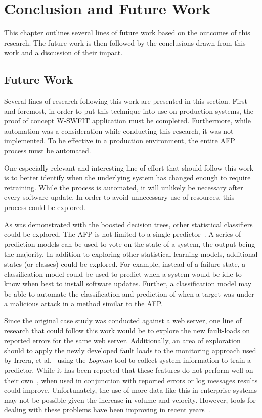 \chapter{Conclusion and Future Work} \label{chapter5}
This chapter outlines several lines of future work based on the outcomes of
this research.  The future work is then followed by the conclusions drawn from
this work and a discussion of their impact.

\section{Future Work}
Several lines of research following this work are presented in this section.
First and foremost, in order to put this technique into use on production
systems, the proof of concept \ac{W-SWFIT} application must be completed.
Furthermore, while automation was a consideration while conducting this
research, it was not implemented.  To be effective in a production environment,
the entire \ac{AFP} process must be automated.

One especially relevant and interesting line of effort that should follow this
work is to better identify when the underlying system has changed enough to
require retraining.  While the process is automated, it will unlikely be
necessary after every software update.  In order to avoid unnecessary use of
resources, this process could be explored.

As was demonstrated with the boosted decision trees, other statistical
classifiers could be explored.  The \ac{AFP} is not limited to a single
predictor~\cite{irrera2015}.  A series of prediction models can be used to vote
on the state of a system, the output being the majority.  In addition to
exploring other statistical learning models, additional states (or classes)
could be explored.  For example, instead of a failure state, a classification
model could be used to predict when a system would be idle to know when best to
install software updates.  Further, a classification model may be able to
automate the classification and prediction of when a target was under a
malicious attack in a method similar to the \ac{AFP}.

Since the original case study was conducted against a web server, one line of
research that could follow this work would be to explore the new fault-loads on
reported errors for the same web server.  Additionally, an area of exploration
should to apply the newly developed fault loads to the monitoring approach
used by Irrera, et al.~\cite{irrera2015} using the \emph{Logman} tool to
collect system information to train a predictor.  While it has been reported
that these features do not perform well on their own~\cite{salfnerSurvey}, when
used in conjunction with reported errors or log messages results could improve.
Unfortunately, the use of more data like this in enterprise systems may not be
possible given the increase in volume and velocity.  However, tools for dealing
with these problems have been improving in recent years~\cite{meng2016}.

